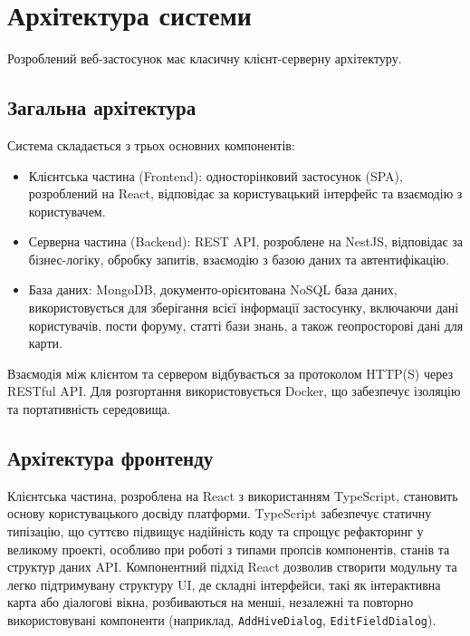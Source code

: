 \section{Архітектура системи}
\label{sec:architecture}
Розроблений веб-застосунок має класичну клієнт-серверну архітектуру. 

\subsection{Загальна архітектура}
Система складається з трьох основних компонентів: 
\begin{itemize}
    \item Клієнтська частина (Frontend): односторінковий застосунок (SPA), розроблений на React, відповідає за користувацький інтерфейс та взаємодію з користувачем.
    \item Серверна частина (Backend): REST API, розроблене на NestJS, відповідає за бізнес-логіку, обробку запитів, взаємодію з базою даних та автентифікацію.
    \item База даних: MongoDB, документо-орієнтована NoSQL база даних, використовується для зберігання всієї інформації застосунку, включаючи дані користувачів, пости форуму, статті бази знань, а також геопросторові дані для карти.
\end{itemize}
Взаємодія між клієнтом та сервером відбувається за протоколом HTTP(S) через RESTful API. Для розгортання використовується Docker, що забезпечує ізоляцію та портативність середовища.

\subsection{Архітектура фронтенду}
Клієнтська частина, розроблена на React \cite{react} з використанням TypeScript, становить основу користувацького досвіду платформи. TypeScript забезпечує статичну типізацію, що суттєво підвищує надійність коду та спрощує рефакторинг у великому проекті, особливо при роботі з типами пропсів компонентів, станів та структур даних API. Компонентний підхід React дозволив створити модульну та легко підтримувану структуру UI, де складні інтерфейси, такі як інтерактивна карта або діалогові вікна, розбиваються на менші, незалежні та повторно використовувані компоненти (наприклад, \texttt{AddHiveDialog}, \texttt{EditFieldDialog}).

